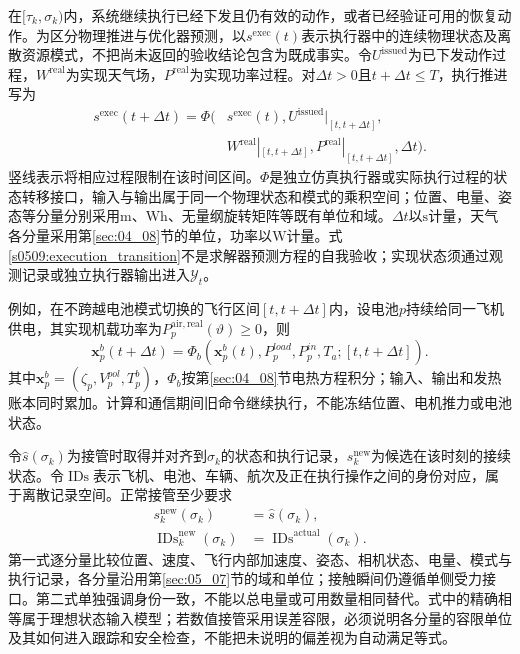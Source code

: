 在$[\tau_k,\sigma_k)$内，系统继续执行已经下发且仍有效的动作，或者已经验证可用的恢复动作。为区分物理推进与优化器预测，以$s^{\mathrm{exec}}(t)$表示执行器中的连续物理状态及离散资源模式，不把尚未返回的验收结论包含为既成事实。令$U^{\mathrm{issued}}$为已下发动作过程，$W^{\mathrm{real}}$为实现天气场，$P^{\mathrm{real}}$为实现功率过程。对$\Delta t>0$且$t+\Delta t\le T$，执行推进写为
\begin{equation}
 \begin{aligned}
 s^{\mathrm{exec}}(t+\Delta t)=\Phi\bigl(&s^{\mathrm{exec}}(t),
 U^{\mathrm{issued}}|_{[t,t+\Delta t]},\\
 &W^{\mathrm{real}}|_{[t,t+\Delta t]},
 P^{\mathrm{real}}|_{[t,t+\Delta t]},\Delta t\bigr).
 \end{aligned}
 \label{s0509:execution_transition}
\end{equation}
竖线表示将相应过程限制在该时间区间。$\Phi$是独立仿真执行器或实际执行过程的状态转移接口，输入与输出属于同一个物理状态和模式的乘积空间；位置、电量、姿态等分量分别采用$\mathrm m$、$\mathrm{Wh}$、无量纲旋转矩阵等既有单位和域。$\Delta t$以$\mathrm s$计量，天气各分量采用第\ref{sec:04_08}节的单位，功率以$\mathrm W$计量。式\eqref{s0509:execution_transition}不是求解器预测方程的自我验收；实现状态须通过观测记录或独立执行器输出进入$\mathcal Y_t$。

例如，在不跨越电池模式切换的飞行区间$[t,t+\Delta t]$内，设电池$p$持续给同一飞机供电，其实现机载功率为$P_p^{\mathrm{air,real}}(\vartheta)\ge0$，则
\begin{equation}
 \mathbf x_p^b(t+\Delta t)=\Phi_b(\mathbf x_p^b(t),P_p^{load},P_p^{in},T_a;[t,t+\Delta t]).
 \label{s0509:execution_energy}
\end{equation}
其中$\mathbf x_p^b=(\zeta_p,V_p^{pol},T_p^b)$，$\Phi_b$按第\ref{sec:04_08}节电热方程积分；输入、输出和发热账本同时累加。计算和通信期间旧命令继续执行，不能冻结位置、电机推力或电池状态。


令$\widehat s(\sigma_k)$为接管时取得并对齐到$\sigma_k$的状态和执行记录，$s_k^{\mathrm{new}}$为候选在该时刻的接续状态。令$\operatorname{IDs}$表示飞机、电池、车辆、航次及正在执行操作之间的身份对应，属于离散记录空间。正常接管至少要求
\begin{align}
 s_k^{\mathrm{new}}(\sigma_k)&=\widehat s(\sigma_k),
 \label{s0509:takeover_state}\\
 \operatorname{IDs}_k^{\mathrm{new}}(\sigma_k)
 &=\operatorname{IDs}^{\mathrm{actual}}(\sigma_k).
 \label{s0509:takeover_identity}
\end{align}
第一式逐分量比较位置、速度、飞行内部加速度、姿态、相机状态、电量、模式与执行记录，各分量沿用第\ref{sec:05_07}节的域和单位；接触瞬间仍遵循单侧受力接口。第二式单独强调身份一致，不能以总电量或可用数量相同替代。式中的精确相等属于理想状态输入模型；若数值接管采用误差容限，必须说明各分量的容限单位及其如何进入跟踪和安全检查，不能把未说明的偏差视为自动满足等式。

